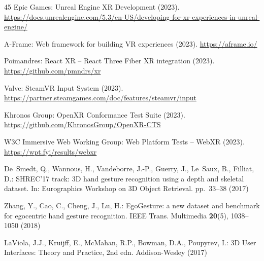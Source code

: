 \documentclass[11pt,a4paper]{article}
\begin{document}
\begin{thebibliography}{45}
Epic Games: Unreal Engine XR Development (2023).
\url{https://docs.unrealengine.com/5.3/en-US/developing-for-xr-experiences-in-unreal-engine/}

A-Frame: Web framework for building VR experiences (2023).
\url{https://aframe.io/}

Poimandres: React XR -- React Three Fiber XR integration (2023).
\url{https://github.com/pmndrs/xr}

Valve: SteamVR Input System (2023).
\url{https://partner.steamgames.com/doc/features/steamvr/input}

Khronos Group: OpenXR Conformance Test Suite (2023).
\url{https://github.com/KhronosGroup/OpenXR-CTS}

W3C Immersive Web Working Group: Web Platform Tests -- WebXR (2023).
\url{https://wpt.fyi/results/webxr}

De~Smedt, Q., Wannous, H., Vandeborre, J.-P., Guerry, J., Le~Saux, B., Filliat, D.:
SHREC'17 track: 3D hand gesture recognition using a depth and skeletal dataset.
In: Eurographics Workshop on 3D Object Retrieval. pp.~33--38 (2017)

Zhang, Y., Cao, C., Cheng, J., Lu, H.:
EgoGesture: a new dataset and benchmark for egocentric hand gesture recognition.
IEEE Trans. Multimedia \textbf{20}(5), 1038--1050 (2018)

LaViola, J.J., Kruijff, E., McMahan, R.P., Bowman, D.A., Poupyrev, I.:
3D User Interfaces: Theory and Practice, 2nd edn.
Addison-Wesley (2017)

\end{thebibliography}
\end{document}

